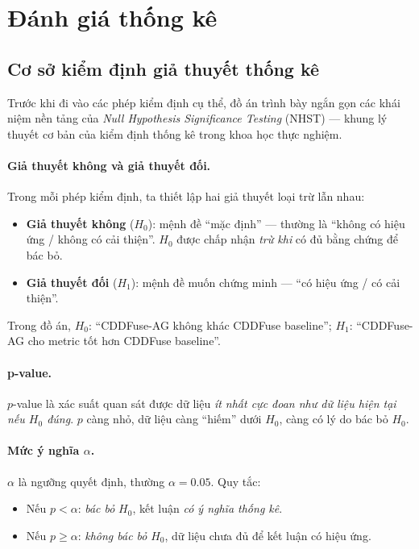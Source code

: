 \section{Đánh giá thống kê}
\label{sec:stats-bg}

\subsection{Cơ sở kiểm định giả thuyết thống kê}
\label{ssec:hypothesis-testing}

Trước khi đi vào các phép kiểm định cụ thể, đồ án trình bày ngắn gọn các khái niệm nền tảng của \emph{Null Hypothesis Significance Testing} (NHST) --- khung lý thuyết cơ bản của kiểm định thống kê trong khoa học thực nghiệm.

\paragraph{Giả thuyết không và giả thuyết đối.}
Trong mỗi phép kiểm định, ta thiết lập hai giả thuyết loại trừ lẫn nhau:
\begin{itemize}\itemsep0pt
    \item \textbf{Giả thuyết không} ($H_0$): mệnh đề ``mặc định'' --- thường là ``không có hiệu ứng / không có cải thiện''. $H_0$ được chấp nhận \emph{trừ khi} có đủ bằng chứng để bác bỏ.
    \item \textbf{Giả thuyết đối} ($H_1$): mệnh đề muốn chứng minh --- ``có hiệu ứng / có cải thiện''.
\end{itemize}
Trong đồ án, $H_0$: ``CDDFuse-AG không khác CDDFuse baseline''; $H_1$: ``CDDFuse-AG cho metric tốt hơn CDDFuse baseline''.

\paragraph{p-value.}
$p$-value là xác suất quan sát được dữ liệu \emph{ít nhất cực đoan như dữ liệu hiện tại} \emph{nếu $H_0$ đúng}. $p$ càng nhỏ, dữ liệu càng ``hiếm'' dưới $H_0$, càng có lý do bác bỏ $H_0$.

\paragraph{Mức ý nghĩa $\alpha$.}
$\alpha$ là ngưỡng quyết định, thường $\alpha = 0.05$. Quy tắc:
\begin{itemize}\itemsep0pt
    \item Nếu $p < \alpha$: \emph{bác bỏ} $H_0$, kết luận \emph{có ý nghĩa thống kê}.
    \item Nếu $p \ge \alpha$: \emph{không bác bỏ} $H_0$, dữ liệu chưa đủ để kết luận có hiệu ứng.
\end{itemize}


